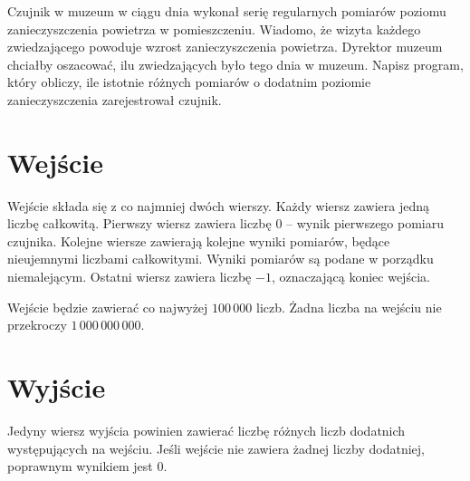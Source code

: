 \documentclass{spiral-kurs}
\begin{document}
\makeheader
%
    Czujnik w muzeum w ciągu dnia wykonał serię regularnych pomiarów
    poziomu zanieczyszczenia powietrza w pomieszczeniu.
    Wiadomo, że wizyta każdego zwiedzającego powoduje wzrost zanieczyszczenia powietrza.
    Dyrektor muzeum chciałby oszacować, ilu zwiedzających było tego dnia w muzeum.
    Napisz program, który obliczy, ile istotnie różnych pomiarów o dodatnim poziomie
    zanieczyszczenia zarejestrował czujnik.

    \section{Wejście}
    Wejście składa się z co najmniej dwóch wierszy.
    Każdy wiersz zawiera jedną liczbę całkowitą.
    Pierwszy wiersz zawiera liczbę 0 -- wynik pierwszego pomiaru czujnika.
    Kolejne wiersze zawierają kolejne wyniki pomiarów, będące
    nieujemnymi liczbami całkowitymi.
    Wyniki pomiarów są podane w porządku niemalejącym.
    Ostatni wiersz zawiera liczbę $-1$, oznaczającą koniec wejścia.

    Wejście będzie zawierać co najwyżej $100\,000$ liczb.
    Żadna liczba na wejściu nie przekroczy $1\,000\,000\,000$.
      
    \section{Wyjście}
    Jedyny wiersz wyjścia powinien zawierać liczbę różnych liczb dodatnich
    występujących na wejściu.
    Jeśli wejście nie zawiera żadnej liczby dodatniej, poprawnym wynikiem jest 0.



  
\end{document}
